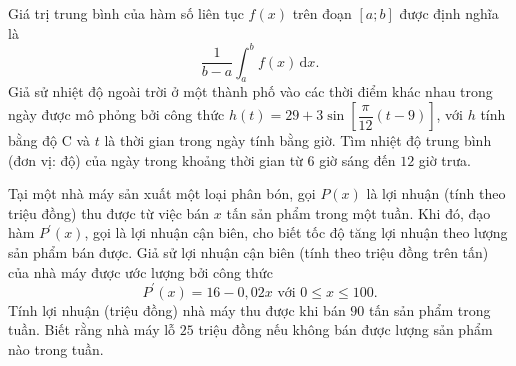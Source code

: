 \begin{bt}%
	Giá trị trung bình của hàm số liên tục $f(x)$ trên đoạn $[a ; b]$ được định nghĩa là
	$$
	\dfrac{1}{b-a} \int_a^b f(x) \mathrm{\,d}x .
	$$
	Giả sử nhiệt độ ngoài trời ở một thành phố vào các thời điểm khác nhau trong ngày được mô phỏng bởi công thức $	h(t)=29+3 \sin \left[\dfrac{\pi}{12}(t-9)\right]$, với $h$ tính bằng độ $\mathrm{C}$ và $t$ là thời gian trong ngày tính bằng giờ.	Tìm nhiệt độ trung bình (đơn vị: độ) của ngày trong khoảng thời gian từ $6$ giờ sáng đến $12$ giờ trưa.
\end{bt}

\begin{bt}%
Tại một nhà máy sản xuất một loại phân bón, gọi $P(x)$ là lợi nhuận (tính theo triệu đồng) thu được từ việc bán $x$ tấn sản phẩm trong một tuần. Khi đó, đạo hàm $P^{\prime}(x)$, gọi là lợi nhuận cận biên, cho biết tốc độ tăng lợi nhuận theo lượng sản phẩm bán được. Giả sử lợi nhuận cận biên (tính theo triệu đồng trên tấn) của nhà máy được ước lượng bởi công thức
$$
P^{\prime}(x)=16-0{,}02 x \text { với } 0 \leq x \leq 100.
$$
Tính lợi nhuận (triệu đồng) nhà máy thu được khi bán $90$ tấn sản phẩm trong tuần. Biết rằng nhà máy lỗ $25$ triệu đồng nếu không bán được lượng sản phẩm nào trong tuần.
\end{bt}

